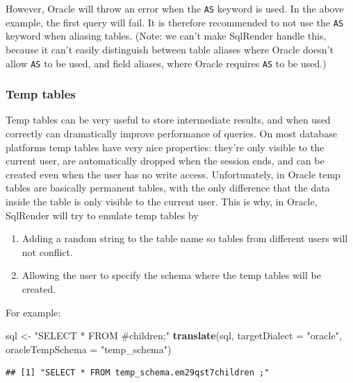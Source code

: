 \documentclass[11pt]{book}
\newenvironment{Shaded}{\begin{snugshade}}{\end{snugshade}}
\newcommand{\DataTypeTok}[1]{\textcolor[rgb]{0.13,0.29,0.53}{#1}}
\newcommand{\KeywordTok}[1]{\textcolor[rgb]{0.13,0.29,0.53}{\textbf{#1}}}
\newcommand{\NormalTok}[1]{#1}
\newcommand{\StringTok}[1]{\textcolor[rgb]{0.31,0.60,0.02}{#1}}
\providecommand{\tightlist}{%
  \setlength{\itemsep}{0pt}\setlength{\parskip}{0pt}}
\theoremstyle{definition}
\theoremstyle{definition}
\theoremstyle{definition}
\theoremstyle{remark}
\begin{document}
However, Oracle will throw an error when the \texttt{AS} keyword is used. In the above example, the first query will fail. It is therefore recommended to not use the \texttt{AS} keyword when aliasing tables. (Note: we can't make SqlRender handle this, because it can't easily distinguish between table aliases where Oracle doesn't allow \texttt{AS} to be used, and field aliases, where Oracle requires \texttt{AS} to be used.)

\hypertarget{temp-tables}{%
\subsubsection*{Temp tables}\label{temp-tables}}

Temp tables can be very useful to store intermediate results, and when used correctly can dramatically improve performance of queries. On most database platforms temp tables have very nice properties: they're only visible to the current user, are automatically dropped when the session ends, and can be created even when the user has no write access. Unfortunately, in Oracle temp tables are basically permanent tables, with the only difference that the data inside the table is only visible to the current user. This is why, in Oracle, SqlRender will try to emulate temp tables by

\begin{enumerate}
\def\labelenumi{\arabic{enumi}.}
\tightlist
\item
  Adding a random string to the table name so tables from different users will not conflict.
\item
  Allowing the user to specify the schema where the temp tables will be created.
\end{enumerate}

For example:

\begin{Shaded}
\begin{Highlighting}[]
\NormalTok{sql <-}\StringTok{ "SELECT * FROM #children;"}
\KeywordTok{translate}\NormalTok{(sql, }\DataTypeTok{targetDialect =} \StringTok{"oracle"}\NormalTok{, }\DataTypeTok{oracleTempSchema =} \StringTok{"temp_schema"}\NormalTok{)}
\end{Highlighting}
\end{Shaded}

\begin{verbatim}
## [1] "SELECT * FROM temp_schema.em29qst7children ;"
\end{verbatim}
\end{document}
